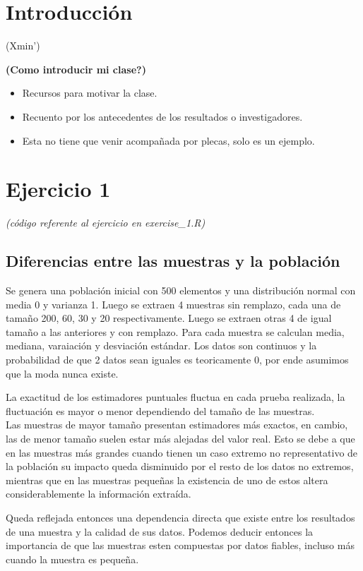 \documentclass[10pt,twocolumn,a4paper]{article}
\begin{document}
\section*{Introducci\'on} 
 
 (Xmin')

\textbf{(Como introducir mi clase?)}
		\begin{itemize}
			\item Recursos para motivar la clase.
			\item Recuento por los antecedentes de los resultados o investigadores.
			\item Esta no tiene que venir acompañada por plecas, solo es un ejemplo.
		\end{itemize}	
		

\section*{Ejercicio 1}
\textit{(c\'odigo referente al ejercicio en exercise\_1.R)}
 
\subsection*{Diferencias entre las muestras y la poblaci\'on}

Se genera una poblaci\'on inicial con 500 elementos y una distribución normal con media 0 y varianza 1. Luego se extraen 4 muestras sin remplazo, cada una de tamaño 200, 60, 30 y 20 respectivamente. Luego se extraen otras 4 de igual tamaño a las anteriores y con remplazo. Para cada muestra se calculan media, mediana, varaiaci\'on y desviaci\'on est\'andar. Los datos son continuos y la probabilidad de que 2 datos sean iguales es teoricamente 0, por ende asumimos que la moda nunca existe.

La exactitud de los estimadores puntuales fluctua en cada prueba realizada, la fluctuaci\'on es mayor o menor dependiendo del tama\~no de las muestras.\\
Las muestras de mayor tamaño presentan estimadores más exactos, en cambio, las de menor tamaño suelen estar más alejadas del valor real.
Esto se debe a que en las muestras más grandes cuando tienen un caso extremo no representativo de la población su impacto queda disminuido por el resto de los datos no extremos,
mientras que en las muestras pequeñas la existencia de uno de estos altera considerablemente la información extra\'ida.

Queda reflejada entonces una dependencia directa que existe entre los resultados de una muestra y la calidad de sus datos. Podemos deducir entonces la importancia de que las muestras esten compuestas por datos fiables, incluso m\'as cuando la muestra es peque\~na.\\
\end{document}
